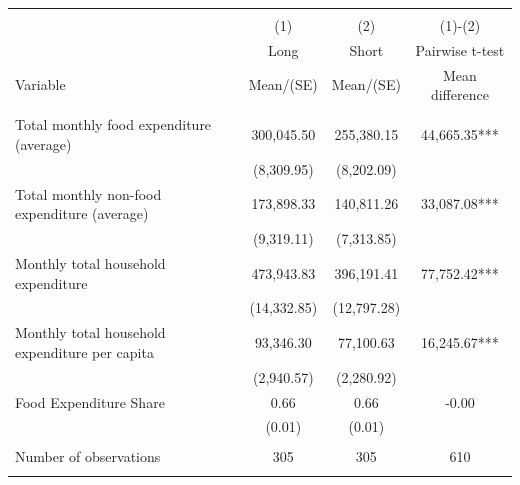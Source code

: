 
\begin{tabular}{@{\extracolsep{5pt}}lccc}
\\[-1.8ex]\hline \hline \\[-1.8ex]
 & \multicolumn{1}{c}{(1)}  & \multicolumn{1}{c}{(2)}  & \multicolumn{1}{c}{(1)-(2)} \\
 & \multicolumn{1}{c}{Long}  & \multicolumn{1}{c}{Short}  & \multicolumn{1}{c}{Pairwise t-test}  \\
Variable & Mean/(SE) & Mean/(SE) & Mean difference \\ \hline \\[-1.8ex] 
Total monthly food expenditure (average)   & 300,045.50    & 255,380.15    & 44,665.35***   \\
 & (8,309.95)  & (8,202.09)  &  \\ [1ex]
Total monthly non-food expenditure (average)   & 173,898.33    & 140,811.26    & 33,087.08***   \\
 & (9,319.11)  & (7,313.85)  &  \\ [1ex]
Monthly total household expenditure   & 473,943.83    & 396,191.41    & 77,752.42***   \\
 & (14,332.85)  & (12,797.28)  &  \\ [1ex]
Monthly total household expenditure per capita   & 93,346.30    & 77,100.63    & 16,245.67***   \\
 & (2,940.57)  & (2,280.92)  &  \\ [1ex]
Food Expenditure Share   & 0.66    & 0.66    & -0.00   \\
 & (0.01)  & (0.01)  &  \\ [1ex]
\hline \\[-1.8ex]
Number of observations  & 305   & 305  & 610  \\
\hline \hline \\[-1.8ex]

\end{tabular}

